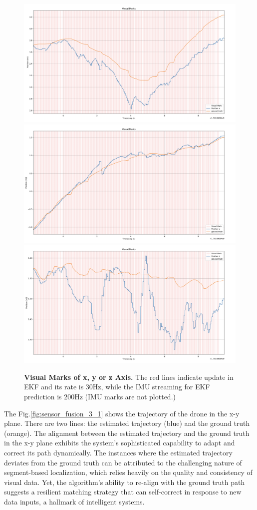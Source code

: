 \begin{figure}[H]
    \centering
    \includegraphics[width=.8\linewidth]{Pictures/sensor_fusion/Screenshot 2024-01-14 at 23.17.01.png}\hfill
    \includegraphics[width=.8\linewidth]{Pictures/sensor_fusion/Screenshot 2024-01-14 at 23.18.00.png}\hfill
    \includegraphics[width=.8\linewidth]{Pictures/sensor_fusion/Screenshot 2024-01-14 at 23.18.33.png}
    \caption{\textbf{Visual Marks of x, y or z Axis.} The red lines indicate update in EKF and its rate is 30Hz, while the IMU streaming for EKF prediction is 200Hz (IMU marks are not plotted.)}
    \label{fig:sensor_fusion_3_3}
\end{figure}


The Fig.\ref{fig:sensor_fusion_3_1} shows the trajectory of the drone in the x-y plane. There are two lines: the estimated trajectory (blue) and the ground truth (orange). The alignment between the estimated trajectory and the ground truth in the x-y plane exhibits the system's sophisticated capability to adapt and correct its path dynamically. The instances where the estimated trajectory deviates from the ground truth can be attributed to the challenging nature of segment-based localization, which relies heavily on the quality and consistency of visual data. Yet, the algorithm's ability to re-align with the ground truth path suggests a resilient matching strategy that can self-correct in response to new data inputs, a hallmark of intelligent systems.

